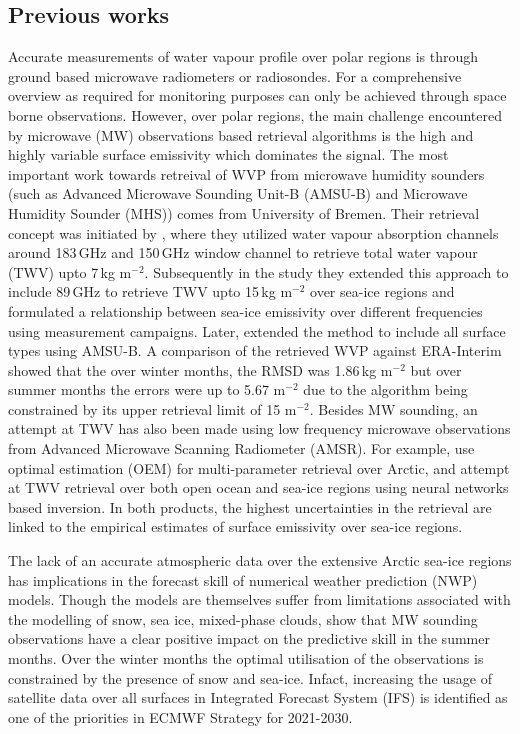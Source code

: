 \documentclass[12pt,oneside,a4paper]{article}
\begin{document}
\subsection{Previous works}
%
\label{sec:previousworks}
Accurate measurements of water vapour profile over polar regions is through ground based microwave radiometers or radiosondes. For a comprehensive overview as required for monitoring purposes can only be achieved through space borne observations. However, over polar regions, the main challenge encountered by microwave (MW) observations based retrieval algorithms is the high and highly variable surface emissivity which dominates the signal. The most important work towards retreival of WVP from microwave humidity sounders (such as Advanced Microwave Sounding Unit-B (AMSU-B) and Microwave Humidity Sounder (MHS)) comes from University of Bremen. Their retrieval concept was initiated by \citet{miao:2001:atmos}, where they utilized water vapour absorption channels around 183\,GHz and  150\,GHz window channel to retrieve total water vapour (TWV) upto 7\,kg m$^{-2}$. Subsequently in the study \citep{} they extended this approach to include 89\,GHz to retrieve TWV upto 15\,kg m$^{-2}$ over sea-ice regions and formulated a relationship between sea-ice emissivity over different frequencies using measurement campaigns. Later, \cite{scarlat:2018:retri} extended the method to include all surface types using AMSU-B. A comparison of the retrieved WVP against ERA-Interim showed that the over winter months, the RMSD was  1.86\,kg m$^{-2}$ but over summer months the errors were up to 5.67 m$^{-2}$ due to the algorithm being constrained by its upper retrieval limit of 15 m$^{-2}$. Besides MW sounding, an attempt at TWV has also been made using low frequency microwave observations from Advanced Microwave Scanning Radiometer (AMSR). For example, \citet{scarlat:2017:exper} use optimal estimation (OEM) for multi-parameter retrieval over Arctic, and \citet{zabolotskikh:2020:anadv} attempt at TWV retrieval over both open ocean and sea-ice regions using neural networks based inversion. In both products, the highest uncertainties in the retrieval are linked to the empirical estimates of surface emissivity over sea-ice regions.


The lack of an accurate atmospheric data over the extensive Arctic sea-ice regions has implications in the forecast skill of numerical weather prediction (NWP) models. Though the  models are themselves suffer from limitations associated with the modelling of snow, sea ice, mixed-phase clouds, \citet{lawrence:2019:usean} show that MW sounding observations have a clear positive impact on the predictive skill in the summer months. Over the winter months the optimal utilisation of the observations is constrained by the presence of snow and sea-ice. Infact,  increasing the usage of satellite data over all surfaces in Integrated Forecast System (IFS) is identified as one of the priorities in ECMWF Strategy for 2021-2030. 
\end{document}
